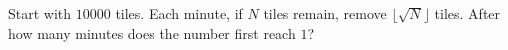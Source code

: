 Start with $10000$ tiles. Each minute, if $N$ tiles remain, remove $\lfloor\sqrt N\rfloor$ tiles. After how many minutes does the number first reach $1$?
